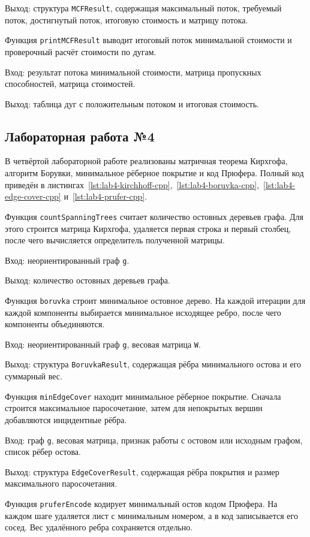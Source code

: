 \documentclass[a4paper,final]{article}
\begin{document}
Выход: структура \texttt{MCFResult}, содержащая максимальный поток, требуемый поток, достигнутый поток, итоговую стоимость и матрицу потока.

Функция \texttt{printMCFResult} выводит итоговый поток минимальной стоимости и проверочный расчёт стоимости по дугам.

Вход: результат потока минимальной стоимости, матрица пропускных способностей, матрица стоимостей.

Выход: таблица дуг с положительным потоком и итоговая стоимость.

\subsection{Лабораторная работа №4}

В четвёртой лабораторной работе реализованы матричная теорема Кирхгофа, алгоритм Борувки, минимальное рёберное покрытие и код Прюфера. Полный код приведён в листингах~\ref{lst:lab4-kirchhoff-cpp},~\ref{lst:lab4-boruvka-cpp},~\ref{lst:lab4-edge-cover-cpp} и~\ref{lst:lab4-prufer-cpp}.

Функция \texttt{countSpanningTrees} считает количество остовных деревьев графа. Для этого строится матрица Кирхгофа, удаляется первая строка и первый столбец, после чего вычисляется определитель полученной матрицы.

Вход: неориентированный граф \texttt{g}.

Выход: количество остовных деревьев графа.

Функция \texttt{boruvka} строит минимальное остовное дерево. На каждой итерации для каждой компоненты выбирается минимальное исходящее ребро, после чего компоненты объединяются.

Вход: неориентированный граф \texttt{g}, весовая матрица \texttt{W}.

Выход: структура \texttt{BoruvkaResult}, содержащая рёбра минимального остова и его суммарный вес.

Функция \texttt{minEdgeCover} находит минимальное рёберное покрытие. Сначала строится максимальное паросочетание, затем для непокрытых вершин добавляются инцидентные рёбра.

Вход: граф \texttt{g}, весовая матрица, признак работы с остовом или исходным графом, список рёбер остова.

Выход: структура \texttt{EdgeCoverResult}, содержащая рёбра покрытия и размер максимального паросочетания.

Функция \texttt{pruferEncode} кодирует минимальный остов кодом Прюфера. На каждом шаге удаляется лист с минимальным номером, а в код записывается его сосед. Вес удалённого ребра сохраняется отдельно.
\end{document}
